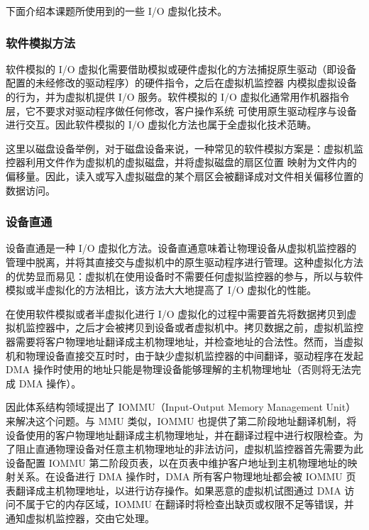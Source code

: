 下面介绍本课题所使用到的一些 I/O 虚拟化技术。

\subsubsection{软件模拟方法}

软件模拟的 I/O 虚拟化需要借助模拟或硬件虚拟化的方法捕捉原生驱动（即设备配置的未经修改的驱动程序）的硬件指令，之后在虚拟机监控器
内模拟虚拟设备的行为，并为虚拟机提供 I/O 服务。软件模拟的 I/O 虚拟化通常用作机器指令层，它不要求对驱动程序做任何修改，客户操作系统 
可使用原生驱动程序与设备进行交互。因此软件模拟的 I/O 虚拟化方法也属于全虚拟化技术范畴。\cite{陈海波2019现代操作系统} 

这里以磁盘设备举例，对于磁盘设备来说，一种常见的软件模拟方案是：虚拟机监控器利用文件作为虚拟机的虚拟磁盘，并将虚拟磁盘的扇区位置
映射为文件内的偏移量。因此，读入或写入虚拟磁盘的某个扇区会被翻译成对文件相关偏移位置的数据访问。\cite{陈海波2019现代操作系统}

\subsubsection{设备直通}
设备直通是一种 I/O 虚拟化方法。设备直通意味着让物理设备从虚拟机监控器的管理中脱离，并将其直接交与虚拟机中的原生驱动程序进行管理。这种虚拟化方法的优势显而易见：虚拟机在使用设备时不需要任何虚拟监控器的参与，所以与软件模拟或半虚拟化的方法相比，该方法大大地提高了 I/O 虚拟化的性能。

在使用软件模拟或者半虚拟化进行 I/O 虚拟化的过程中需要首先将数据拷贝到虚拟机监控器中，之后才会被拷贝到设备或者虚拟机中。拷贝数据之前，虚拟机监控器需要将客户物理地址翻译成主机物理地址，并检查地址的合法性。然而，当虚拟机和物理设备直接交互时时，由于缺少虚拟机监控器的中间翻译，驱动程序在发起 DMA 操作时使用的地址只能是物理设备能够理解的主机物理地址（否则将无法完成 DMA 操作）。\cite{陈海波2019现代操作系统}

因此体系结构领域提出了 IOMMU（Input-Output Memory Management Unit）来解决这个问题。与 MMU 类似，IOMMU 也提供了第二阶段地址翻译机制，将设备使用的客户物理地址翻译成主机物理地址，并在翻译过程中进行权限检查。为了阻止直通物理设备对任意主机物理地址的非法访问，虚拟机监控器首先需要为此设备配置 IOMMU 第二阶段页表，以在页表中维护客户地址到主机物理地址的映射关系。在设备进行 DMA 操作时，DMA 所有客户物理地址都会被 IOMMU 页表翻译成主机物理地址，以进行访存操作。如果恶意的虚拟机试图通过 DMA 访问不属于它的内存区域，IOMMU 在翻译时将检查出缺页或权限不足等错误，并通知虚拟机监控器，交由它处理。\cite{陈海波2019现代操作系统}

